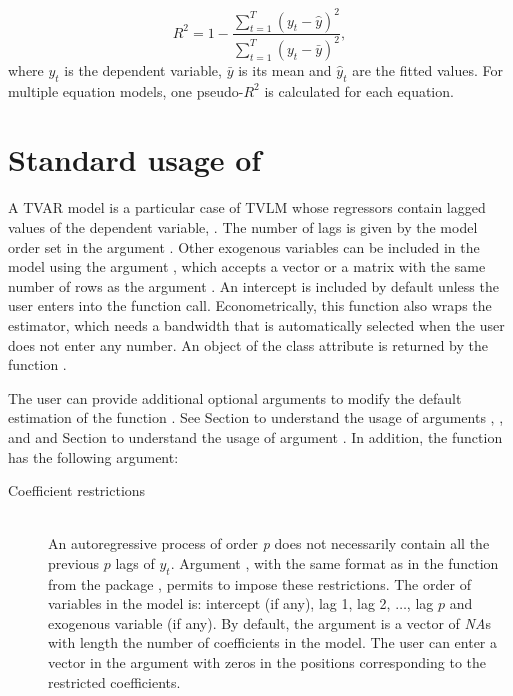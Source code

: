 $$
R^2 = 1 - \frac{\sum_{t=1}^T (y_t - \hat y)^2}{\sum_{t=1}^T (y_t - \bar y)^2},
$$
where $y_t$ is the dependent variable, $\bar y$ is its mean and $\hat y_t$ are the fitted values. For multiple equation models, one pseudo-$R^2$ is calculated for each equation.


\section{Standard usage of }
\label{ssec:tvAR}
A TVAR model is a particular case of TVLM whose regressors contain lagged values of the dependent variable, . The number of lags is given by the model order set in  the argument . Other exogenous variables can be included in the model using the argument , which accepts a vector or a matrix with the same number of rows as the argument . An intercept is included by default unless the user enters  into the function call. Econometrically, this function also wraps the  estimator, which needs a bandwidth  that is automatically selected when the user does not enter any number. An object of the class attribute  is returned by the function . 

The user can provide additional optional arguments to modify the default estimation of the function . See Section  to understand the usage of  arguments , ,  and   and Section  to understand the usage of argument . In addition, the function  has the following argument:

\begin{description}

\item[Coefficient restrictions] \hfill\\
An autoregressive process of order \emph{p} does not necessarily contain all the previous $p$ lags of $y_t$. Argument , with the same format as in the function  from the package , permits to impose these restrictions. The order of variables in the model is: intercept (if any), lag 1, lag 2, $\ldots$, lag $p$ and exogenous variable (if any). By default, the argument  is a vector of \emph{NA}s with length the number of coefficients in the model. The user can enter a vector in the argument  with zeros in the positions corresponding to the restricted coefficients.
\end{description}


